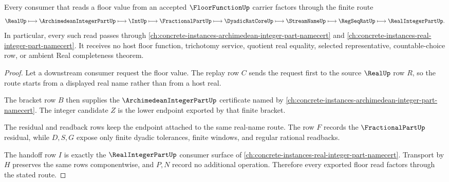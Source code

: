 \begin{theorem}
\label{thm:floor-function-real-integer-part-handoff}
Every consumer that reads a floor value from an accepted $\FloorFunctionUp$ carrier factors through the finite route
$$
\RealUp \longmapsto \ArchimedeanIntegerPartUp \longmapsto \IntUp \longmapsto \FractionalPartUp \longmapsto \DyadicRatCoreUp \longmapsto \StreamNameUp \longmapsto \RegSeqRatUp \longmapsto \RealIntegerPartUp .
$$
In particular, every such read passes through \autoref{ch:concrete-instances-archimedean-integer-part-namecert} and \autoref{ch:concrete-instances-real-integer-part-namecert}. It receives no host floor function, trichotomy service, quotient real equality, selected representative, countable-choice row, or ambient Real completeness theorem.
\end{theorem}
\begin{proof}
Let a downstream consumer request the floor value. The replay row $C$ sends the request first to the source $\RealUp$ row $R$, so the route starts from a displayed real name rather than from a host real.

The bracket row $B$ then supplies the $\ArchimedeanIntegerPartUp$ certificate named by \autoref{ch:concrete-instances-archimedean-integer-part-namecert}. The integer candidate $Z$ is the lower endpoint exported by that finite bracket.

The residual and readback rows keep the endpoint attached to the same real-name route. The row $F$ records the $\FractionalPartUp$ residual, while $D,S,G$ expose only finite dyadic tolerances, finite windows, and regular rational readbacks.

The handoff row $I$ is exactly the $\RealIntegerPartUp$ consumer surface of \autoref{ch:concrete-instances-real-integer-part-namecert}. Transport by $H$ preserves the same rows componentwise, and $P,N$ record no additional operation. Therefore every exported floor read factors through the stated route.
\end{proof}


